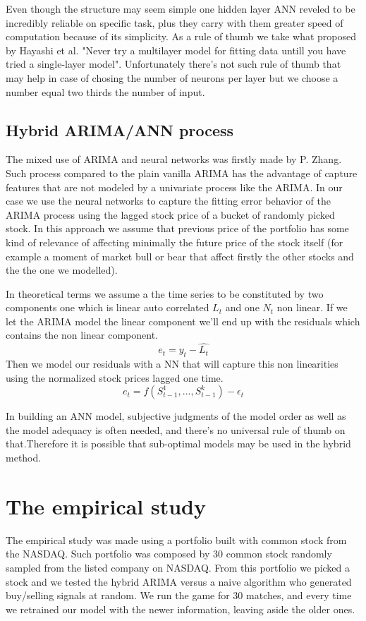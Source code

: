 \documentclass[twocolumn]{article}
\begin{document}
Even though the structure may seem simple one hidden layer ANN reveled to be incredibly reliable on specific task, plus they carry with them greater speed of computation because of its simplicity\cite{the_international_neural_network_society_inns_the_ieee_neural_network_council_cooperating_societies_multi-layer_1990}. As a rule of thumb we take what proposed by Hayashi et al. "Never try a multilayer model for fitting data untill you have tried a single-layer model". Unfortunately there's not such rule of thumb that may help in case of chosing the number of neurons per layer but we choose a number equal two thirds the number of input. 

\subsection{Hybrid ARIMA/ANN process}

The mixed use of ARIMA and neural networks was firstly made by P. Zhang.
Such process compared to the plain vanilla ARIMA has the advantage of capture features that are not modeled by a univariate process like the ARIMA. In our case we use the neural networks to capture the fitting error behavior of the ARIMA process using the lagged stock price of a bucket of randomly picked stock. In this approach we assume that previous price of the portfolio has some kind of relevance of affecting minimally the future price of the stock itself (for example a moment of market bull or bear that affect firstly the other stocks and the the one we modelled).

In theoretical terms we assume a the time series to be constituted by two components one which is linear auto correlated $L_t$ and one $N_t$ non linear. If we let the ARIMA model the linear component we'll end up with the residuals which contains the non linear component.
$$
e_t=y_t-\hat{L_t}
$$
Then we model our residuals with a NN that will capture this non linearities using the normalized stock prices lagged one time.
$$
e_t=f(S^1_{t-1},..., S^k_{t-1})-\epsilon_t
$$

In building an ANN model, subjective judgments of the model order as well as the model adequacy is often needed, and there's no universal rule of thumb on that.Therefore it is possible that sub-optimal models may be used in the hybrid method.

\section{The empirical study}
The empirical study was made using a portfolio built with common stock from the NASDAQ. Such portfolio was composed by 30 common stock randomly sampled from the listed company on NASDAQ. From this portfolio we picked a stock and we tested the hybrid ARIMA versus a naive algorithm who generated buy/selling signals at random. We run the game for 30 matches, and every time we retrained our model with the newer information, leaving aside the older ones.
\end{document}

